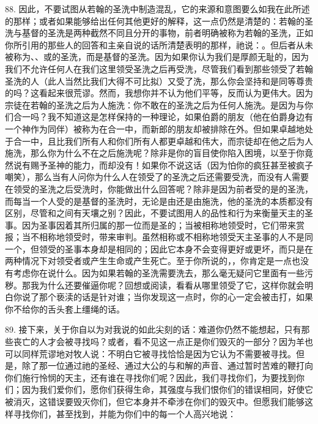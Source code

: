 88. 因此，不要试图从若翰的圣洗中制造混乱，它的来源和意图要么如我在此所述的那样；或者如果能够给出任何其他更好的解释，这一点仍然是清楚的：若翰的圣洗与基督的圣洗是两种截然不同且分开的事物，前者明确被称为若翰的圣洗，正如你所引用的那些人的回答和主亲自说的话所清楚表明的那样，祂说：。但后者从未被称为、、或的圣洗，而是基督的圣洗。因为如果你认为我们是厚颜无耻的，因为我们不允许任何人在我们这里领受圣洗之后再受洗，尽管我们看到那些领受了若翰圣洗的人（此人当然比我们大得不可比拟）又受了洗，那么你会坚持和是同等尊贵的吗？这看起来很荒谬。然而，我想你并不认为他们平等，反而认为更伟大。因为宗徒在若翰的圣洗之后为人施洗：你不敢在的圣洗之后为任何人施洗。是因为与你们合一吗？我不知道这是怎样保持的一种理论，如果伯爵的朋友（他在伯爵身边有一个神作为同伴）被称为在合一中，而新郎的朋友却被排除在外。但如果卓越地处于合一中，且比我们所有人和你们所有人都更卓越和伟大，而宗徒却在他之后为人施洗，那么你为什么不在之后施洗呢？除非是你的盲目使你陷入困境，以至于你竟然说有赐予圣神的能力，而却没有！如果你不说这话（因为怕你的疯狂甚至被疯子嘲笑），那么当有人问你为什么人在领受了的圣洗之后还需要受洗，而没有人需要在领受的圣洗之后受洗时，你能做出什么回答呢？除非是因为前者受的是的圣洗，而每当一个人受的是基督的圣洗时，无论是由还是由施洗，他的圣洗的本质都没有区别，尽管和之间有天壤之别？因此，不要试图用人的品性和行为来衡量天主的圣事。因为圣事因着其所归属的那一位而是圣的；当被相称地领受时，它们带来赏报；当不相称地领受时，带来审判。虽然相称或不相称地领受天主圣事的人不是同一个，但领受的圣事本身却是相同的；因此它本身不会变得更好或更坏，而只是在两种情况下对领受者或产生生命或产生死亡。至于你所说的，，你肯定是一点也没有考虑你在说什么。因为如果若翰的圣洗需要洗去，那么毫无疑问它里面有一些污秽。那我为什么还要催逼你呢？回想或阅读，看看从哪里领受了它，这样你就会明白你说了那个亵渎的话是针对谁；当你发现这一点时，你的心一定会被击打，如果你不给你的舌头套上缰绳的话。\par

89. 接下来，关于你自以为对我说的如此尖刻的话：难道你仍然不能想起，只有那些丧亡的人才会被寻找吗？或者，看不见这一点正是你们毁灭的一部分？因为羊也可以同样荒谬地对牧人说：不明白它被寻找恰恰是因为它认为不需要被寻找。但是，除了那一位通过祂的圣经、通过大公的与和解的声音、通过暂时苦难的鞭打向你们施行怜悯的天主，还有谁在寻找你们呢？因此，我们寻找你们，为要找到你们；因为我们爱你们，愿你们获得生命，其强度与我们恨你们的错误相同，好使它被消灭，这错误要毁灭你们，但它本身并不牵涉在你们的毁灭中。但愿我们能够这样寻找你们，甚至找到，并能为你们中的每一个人高兴地说：\par

